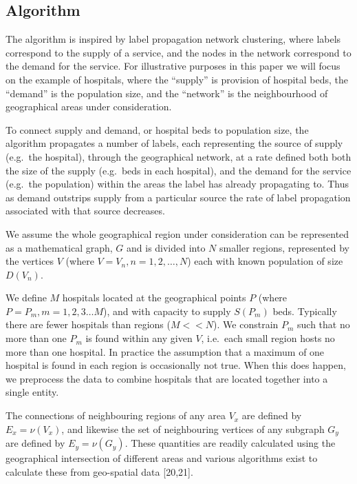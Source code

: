 \documentclass[
]{article}
\begin{document}
\hypertarget{algorithm}{%
\subsection{Algorithm}\label{algorithm}}

The algorithm is inspired by label propagation network clustering, where
labels correspond to the supply of a service, and the nodes in the
network correspond to the demand for the service. For illustrative
purposes in this paper we will focus on the example of hospitals, where
the ``supply'' is provision of hospital beds, the ``demand'' is the
population size, and the ``network'' is the neighbourhood of
geographical areas under consideration.

To connect supply and demand, or hospital beds to population size, the
algorithm propagates a number of labels, each representing the source of
supply (e.g.~the hospital), through the geographical network, at a rate
defined both both the size of the supply (e.g.~beds in each hospital),
and the demand for the service (e.g.~the population) within the areas
the label has already propagating to. Thus as demand outstrips supply
from a particular source the rate of label propagation associated with
that source decreases.

We assume the whole geographical region under consideration can be
represented as a mathematical graph, \(G\) and is divided into \(N\)
smaller regions, represented by the vertices \(V\) (where
\(V=V_n, n = 1,2, \dots, N\)) each with known population of size
\(D(V_n)\).

We define \(M\) hospitals located at the geographical points \(P\)
(where \(P = P_m, m = 1,2,3 \dots M\)), and with capacity to supply
\(S(P_m)\) beds. Typically there are fewer hospitals than regions
(\(M<<N\)). We constrain \(P_m\) such that no more than one \(P_m\) is
found within any given \(V\), i.e.~each small region hosts no more than
one hospital. In practice the assumption that a maximum of one hospital
is found in each region is occasionally not true. When this does happen,
we preprocess the data to combine hospitals that are located together
into a single entity.

The connections of neighbouring regions of any area \(V_x\) are defined
by \(E_x = \nu(V_x)\), and likewise the set of neighbouring vertices of
any subgraph \(G_y\) are defined by \(E_y = \nu(G_y)\). These quantities
are readily calculated using the geographical intersection of different
areas and various algorithms exist to calculate these from geo-spatial
data {[}20,21{]}.
\end{document}
